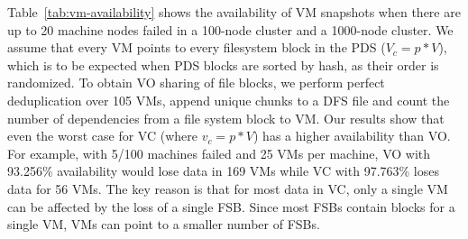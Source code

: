  Table~\ref{tab:vm-availability} shows the availability of VM snapshots when 
there are up to 20 machine nodes failed in a 100-node cluster and  a 1000-node cluster. 
We assume that every VM points to every filesystem block in the PDS ($V_c=p*V$), which is to be expected when PDS
blocks are sorted by hash, as their order is randomized.
To obtain VO sharing of file blocks, we perform perfect deduplication over 105 VMs, 
append unique chunks to a DFS file and
count the number of dependencies from a file system block to VM.
Our results show that even the worst case for VC (where $v_c=p*V$) has a higher availability than VO.
For example, with 5/100 machines failed and 25 VMs per machine, VO with 93.256\% availability would lose data in 169 VMs 
while VC with 97.763\% loses data for 56 VMs.
The key reason is that for most data in VC, only a single
VM can be affected by the loss of a single FSB. Since most FSBs contain blocks for a single VM, VMs can point to a smaller number of FSBs.

